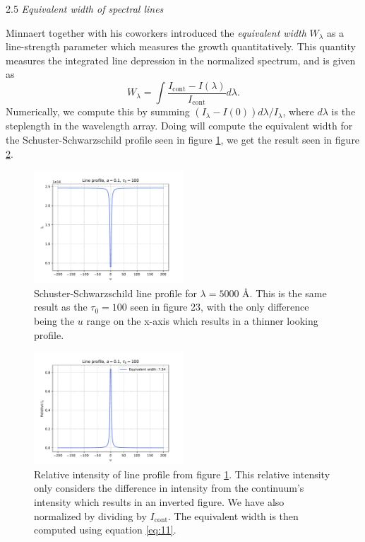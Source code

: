 \documentclass[a4paper,11.5pt,]{article}
\begin{document}
\begin{multicols}{2}
\begin{center}
2.5\textit{ Equivalent width of spectral lines}
\end{center}
Minnaert together with his coworkers introduced the \textit{equivalent width} $W_\lambda$ as a line-strength parameter which measures the growth quantitatively. This quantity measures the integrated line depression in the normalized spectrum, and is given as
\begin{equation}\label{eq:11}
    W_\lambda = \int \frac{I_\text{cont} - I(\lambda)}{I_\text{cont}} d\lambda.
\end{equation}
Numerically, we compute this by summing $(I_\lambda - I(0))d\lambda/I_\lambda$, where $d\lambda$ is the steplength in the wavelength array. Doing will compute the equivalent width for the Schuster-Schwarzschild profile seen in figure \ref{fig:25}, we get the result seen in figure \ref{fig:26}.

\begin{figure}[H]
	\centering
	\includegraphics[width=0.5\textwidth]{SSA/figures/lprof.pdf}
	\caption{Schuster-Schwarzschild line profile for $\lambda = 5000$ Å. This is the same result as the $\tau_0 = 100$ seen in figure 23, with the only difference being the $u$ range on the x-axis which results in a thinner looking profile.}
	\label{fig:25}
\end{figure}

\begin{figure}[H]
	\centering
	\includegraphics[width=0.5\textwidth]{SSA/figures/eqwidth.pdf}
	\caption{Relative intensity of line profile from figure \ref{fig:25}. This relative intensity only considers the difference in intensity from the continuum's intensity which results in an inverted figure. We have also normalized by dividing by $I_\text{cont}$. The equivalent width is then computed using equation \eqref{eq:11}.}
	\label{fig:26}
\end{figure}


\end{multicols}
\end{document}

